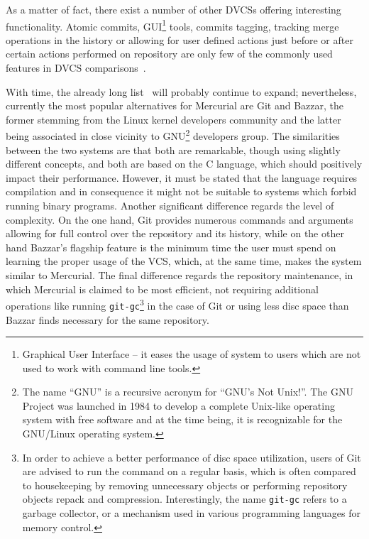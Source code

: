 As a matter of fact, there exist a number of other DVCSs offering interesting functionality. Atomic commits, GUI\footnote{Graphical User Interface -- it eases the usage of system to users which are not used to work with command line tools.} tools, commits tagging, tracking merge operations in the history or allowing for user defined actions just before or after certain actions performed on repository are only few of the commonly used features in DVCS comparisons~\cite{wiki_dvcs_compare}. 

With time, the already long list~\cite{wiki_dvcs_list} will probably continue to expand; nevertheless, currently the most popular alternatives for Mercurial are Git and Bazzar, the former stemming from the Linux kernel developers community and the latter being associated in close vicinity to GNU\footnote{The name “GNU” is a recursive acronym for “GNU's Not Unix!”. The GNU Project was launched in 1984 to develop a complete Unix-like operating system with free software and at the time being, it is recognizable for the GNU/Linux operating system.} developers group. The similarities between the two systems are that both are remarkable, though using slightly different concepts, and both are based on the C language, which should positively impact their performance. However, it must be stated that the language requires compilation and in consequence it might not be suitable to systems which forbid running binary programs. Another significant difference regards the level of complexity. On the one hand, Git provides numerous commands and arguments allowing for full control over the repository and its history, while on the other hand Bazzar's flagship feature is the minimum time the user must spend on learning the proper usage of the VCS, which, at the same time, makes the system similar to Mercurial. The final difference regards the repository maintenance, in which Mercurial is claimed to be most efficient, not requiring additional operations like running \texttt{git-gc}\footnote{In order to achieve a better performance of disc space utilization, users of Git are advised to run the command on a regular basis, which is often compared to housekeeping by removing unnecessary objects or performing repository objects repack and compression. Interestingly, the name \texttt{git-gc} refers to a garbage collector, or a mechanism used in various programming languages for memory control.} in the case of Git or using less disc space than Bazzar finds necessary for the same repository. 


